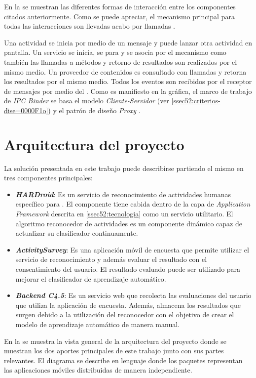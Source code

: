 En la  se muestran las diferentes formas
de interacción entre los componentes  citados anteriormente.
Como se puede apreciar, el mecanismo principal para todas las interacciones
son llevadas acabo por llamadas . 

Una actividad se inicia por medio de un mensaje y puede lanzar otra
actividad en pantalla. Un servicio se inicia, se para y se asocia
por el mecanismo  como también las llamadas a métodos y
retorno de resultados son realizados por el mismo medio. Un proveedor
de contenidos es consultado con llamadas  y retorna los
resultados por el mismo medio. Todos los eventos son recibidos por
el receptor de mensajes por medio del . Como es manifiesto
en la gráfica, el marco de trabajo de \emph{IPC Binder} se basa el
modelo \emph{Cliente-Servidor} (ver \ref{ssec52:criterios-dise=0000F1o})
y el patrón de diseño \emph{Proxy} \cite{Shalloway2004}.

\section{Arquitectura del proyecto}

\label{sec53:arquitectura}La solución presentada en este trabajo
puede describirse partiendo el mismo en tres componentes principales:
\begin{itemize}
\item \textbf{\emph{HARDroid}}: Es un servicio de reconocimiento de actividades
humanas específico para . El componente tiene cabida
dentro de la capa de \emph{Application Framework} descrita en \ref{ssec52:tecnologia}
como un servicio utilitario. El algoritmo reconocedor de actividades
es un componente dinámico capaz de actualizar su clasificador continuamente.
\item \textbf{\emph{ActivitySurvey}}: Es una aplicación móvil de encuesta
que permite utilizar el servicio de reconocimiento y además evaluar
el resultado con el consentimiento del usuario. El resultado evaluado
puede ser utilizado para mejorar el clasificador de aprendizaje automático.
\item \textbf{\emph{Backend C4.5}}: Es un servicio web  que
recolecta las evaluaciones del usuario que utiliza la aplicación de
encuesta. Además, almacena los resultados que surgen debido a la utilización
del reconocedor con el objetivo de crear el modelo de aprendizaje
automático de manera manual. 
\end{itemize}
En la  se muestra la vista general de
la arquitectura del proyecto donde se muestran los dos aportes principales
de este trabajo junto con sus partes relevantes. El diagrama se describe
en lenguaje  donde los paquetes representan las aplicaciones
móviles distribuidas de manera independiente.

